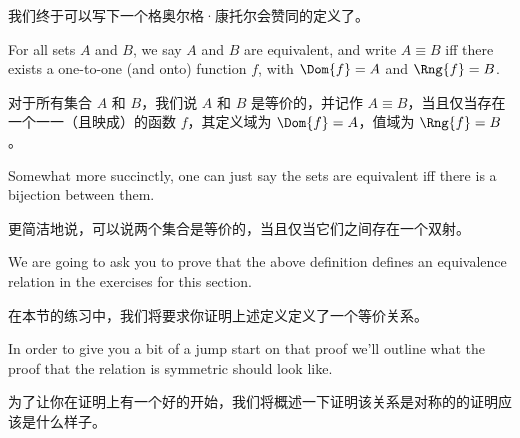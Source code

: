 我们终于可以写下一个格奥尔格·康托尔会赞同的定义了。

\begin{defi}
    For all sets $A$ and $B$, we say $A$ and $B$ are equivalent, and write
    $A \equiv B$ iff there exists a one-to-one (and onto) function $f$, with $\Dom{f} = A$ and $\Rng{f} = B$.
\end{defi}

\begin{defi}
    对于所有集合 $A$ 和 $B$，我们说 $A$ 和 $B$ 是等价的，并记作 $A \equiv B$，当且仅当存在一个一一（且映成）的函数 $f$，其定义域为 $\Dom{f} = A$，值域为 $\Rng{f} = B$。
\end{defi}

Somewhat more succinctly, one can just say the sets are equivalent iff
there is a bijection between them.

更简洁地说，可以说两个集合是等价的，当且仅当它们之间存在一个双射。

We are going to ask you to prove that the above definition defines an
equivalence relation in the exercises for this section.

在本节的练习中，我们将要求你证明上述定义定义了一个等价关系。

In order to give you a
bit of a jump start on that proof we'll outline what the proof that the relation
is symmetric should look like.

为了让你在证明上有一个好的开始，我们将概述一下证明该关系是对称的的证明应该是什么样子。

